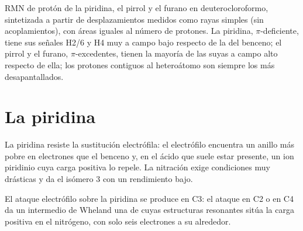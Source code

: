 \begin{omfigure}

{\small RMN de protón de la piridina, el pirrol y el furano en deuterocloroformo,
sintetizada a partir de desplazamientos medidos como rayas simples (sin acoplamientos), con
áreas iguales al número de protones. La piridina, $\pi$-deficiente, tiene sus señales H2/6 y H4
muy a campo bajo respecto de la del benceno; el pirrol y el furano, $\pi$-excedentes, tienen la mayoría
de las suyas a campo alto respecto de ella; los protones contiguos al heteroátomo son siempre los más
desapantallados.}
\end{omfigure}

\section{La piridina}

La piridina resiste la sustitución electrófila: el electrófilo encuentra un anillo
más pobre en electrones que el benceno y, en el ácido que suele estar presente, un
ion piridinio cuya carga positiva lo repele. La nitración exige condiciones muy
drásticas y da el isómero 3 con un rendimiento bajo.

\begin{proposition}\label{prop:b3:heterocycles:pyridine-c3}
El ataque electrófilo sobre la piridina se produce en C3: el ataque en C2 o en C4 da un
intermedio de Wheland una de cuyas estructuras resonantes sitúa la carga
positiva en el nitrógeno, con solo seis electrones a su alrededor.
\end{proposition}

